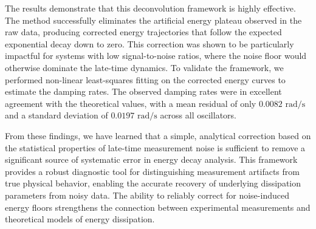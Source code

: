 \documentclass[]{article}
\begin{document}
The results demonstrate that this deconvolution framework is highly effective. The method successfully eliminates the artificial energy plateau observed in the raw data, producing corrected energy trajectories that follow the expected exponential decay down to zero. This correction was shown to be particularly impactful for systems with low signal-to-noise ratios, where the noise floor would otherwise dominate the late-time dynamics. To validate the framework, we performed non-linear least-squares fitting on the corrected energy curves to estimate the damping rates. The observed damping rates were in excellent agreement with the theoretical values, with a mean residual of only $0.0082 \text{ rad/s}$ and a standard deviation of $0.0197 \text{ rad/s}$ across all oscillators.

From these findings, we have learned that a simple, analytical correction based on the statistical properties of late-time measurement noise is sufficient to remove a significant source of systematic error in energy decay analysis. This framework provides a robust diagnostic tool for distinguishing measurement artifacts from true physical behavior, enabling the accurate recovery of underlying dissipation parameters from noisy data. The ability to reliably correct for noise-induced energy floors strengthens the connection between experimental measurements and theoretical models of energy dissipation.


{}

\end{document}
